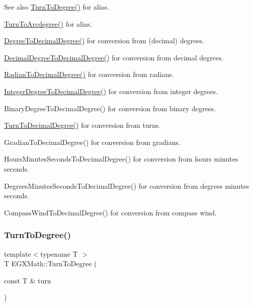 \begin{DoxySeeAlso}{See also}
\mbox{\hyperlink{group___e_g_x_math-_angle_conversions-_turn_ga19eceb6db54a1cf17789639c2a869cb9}{Turn\+To\+Degree()}} for alias. 

\mbox{\hyperlink{group___e_g_x_math-_angle_conversions-_turn_ga7bdc3a81ce316dd47b1a3179489fa195}{Turn\+To\+Arcdegree()}} for alias. 

\mbox{\hyperlink{group___e_g_x_math-_angle_conversions-_degree_ga568afc1d436d425bf5d4edea584aee08}{Degree\+To\+Decimal\+Degree()}} for conversion from (decimal) degrees. 

\mbox{\hyperlink{group___e_g_x_math-_angle_conversions-_decimal_degree_gafccf9cd779903872887978ab9d79661f}{Decimal\+Degree\+To\+Decimal\+Degree()}} for conversion from decimal degrees. 

\mbox{\hyperlink{group___e_g_x_math-_angle_conversions-_radian_ga6d170f1882c32de53167c04524d05f67}{Radian\+To\+Decimal\+Degree()}} for conversion from radians. 

\mbox{\hyperlink{group___e_g_x_math-_angle_conversions-_integer_degree_gac219c3198508ba984d8d81d22831b27d}{Integer\+Degree\+To\+Decimal\+Degree()}} for conversion from integer degrees. 

Binary\+Degree\+To\+Decimal\+Degree() for conversion from binary degrees. 

\mbox{\hyperlink{group___e_g_x_math-_angle_conversions-_turn_ga79231536255e77fb7a158b99a30c1767}{Turn\+To\+Decimal\+Degree()}} for conversion from turns. 

Gradian\+To\+Decimal\+Degree() for conversion from gradians. 

Hours\+Minutes\+Seconds\+To\+Decimal\+Degree() for conversion from hours minutes seconds. 

Degrees\+Minutes\+Seconds\+To\+Decimal\+Degree() for conversion from degrees minutes seconds. 

Compass\+Wind\+To\+Decimal\+Degree() for conversion from compass wind. 
\end{DoxySeeAlso}
\mbox{\label{group___e_g_x_math-_angle_conversions-_turn_ga19eceb6db54a1cf17789639c2a869cb9}} 
\subsubsection{\texorpdfstring{Turn\+To\+Degree()}{TurnToDegree()}}
{\footnotesize\ttfamily template$<$typename T $>$ \\
T E\+G\+X\+Math\+::\+Turn\+To\+Degree (\begin{DoxyParamCaption}\item[{const T \&}]{turn }\end{DoxyParamCaption})}



